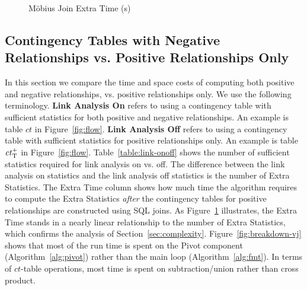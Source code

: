 \documentclass{acm_proc_article-sp}
\newcommand{\ct}{\mathit{ct}}
\begin{document}
\begin{figure}[htbp]
\begin{center}

\caption{M\"obius Join Extra Time (s)
\label{fig:runtime-vj}}
\end{center}
\end{figure}



\subsection{Contingency Tables with Negative Relationships vs. Positive Relationships Only} 
In this section we compare the time and space costs of computing both positive and negative relationships, vs. positive relationships only.
We use the following terminology. \textbf{Link Analysis On} refers to using a contingency table with sufficient statistics for both positive and negative relationships. 
An example is table $\ct$ in Figure~\ref{fig:flow}. 
\textbf{Link Analysis Off} refers to using a contingency table with sufficient statistics for positive relationships only. An example is table $\ct_{\true}^{+}$ %
 in Figure~\ref{fig:flow}. Table~\ref{table:link-onoff} shows the  number of sufficient statistics required for link analysis on vs. off. The difference between the link analysis on statistics  and the link analysis off statistics is the number of Extra Statistics.
The Extra Time column shows how much time the \MJ algorithm requires to compute the Extra Statistics {\em after} the contingency tables for positive relationships are constructed using SQL joins. As Figure~\ref{fig:runtime-vj} illustrates, the Extra Time stands in a nearly linear relationship to the number of Extra Statistics, which confirms the analysis of Section~\ref{sec:complexity}. Figure~\ref{fig:breakdown-vj} shows that most of the \MJ run time is spent on the Pivot component (Algorithm~\ref{alg:pivot}) rather than the main loop (Algorithm~\ref{alg:fmt}). In terms of $\ct$-table operations, most time is spent on subtraction/union rather than cross product.
\end{document}
